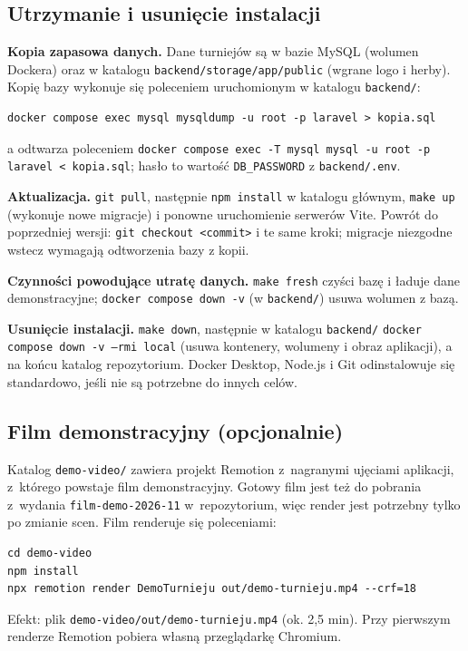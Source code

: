 \documentclass[11pt,a4paper,oneside]{article}
\newif\ifpodpowiedzi
\newcommand{\podpowiedz}[1]{\ifpodpowiedzi\par\begingroup\small\color{hintcolor}\textit{Wskazówka: #1}\par\endgroup\fi}
\begin{document}
\subsection{Utrzymanie i usunięcie instalacji}
\podpowiedz{Jeśli dotyczy: opisz kopie zapasowe i odtwarzanie danych, aktualizację projektu, powrót do poprzedniej wersji i usunięcie instalacji. Wskaż, które pliki lub dane należy zachować oraz które czynności mogą spowodować ich utratę. Dostosuj zakres do projektu; nie twórz procedur dla funkcji, których rozwiązanie nie ma.}
\textbf{Kopia zapasowa danych.} Dane turniejów są w bazie MySQL (wolumen Dockera) oraz w katalogu \texttt{backend/storage/app/public} (wgrane logo i herby). Kopię bazy wykonuje się poleceniem uruchomionym w katalogu \texttt{backend/}:
\begin{verbatim}
docker compose exec mysql mysqldump -u root -p laravel > kopia.sql
\end{verbatim}
a odtwarza poleceniem \texttt{docker compose exec -T mysql mysql -u root -p laravel < kopia.sql}; hasło to wartość \texttt{DB\_PASSWORD} z \texttt{backend/.env}.

\textbf{Aktualizacja.} \texttt{git pull}, następnie \texttt{npm install} w katalogu głównym, \texttt{make up} (wykonuje nowe migracje) i ponowne uruchomienie serwerów Vite. Powrót do poprzedniej wersji: \texttt{git checkout <commit>} i te same kroki; migracje niezgodne wstecz wymagają odtworzenia bazy z kopii.

\textbf{Czynności powodujące utratę danych.} \texttt{make fresh} czyści bazę i ładuje dane demonstracyjne; \texttt{docker compose down -v} (w \texttt{backend/}) usuwa wolumen z bazą.

\textbf{Usunięcie instalacji.} \texttt{make down}, następnie w katalogu \texttt{backend/} \texttt{docker compose down -v --rmi local} (usuwa kontenery, wolumeny i obraz aplikacji), a na końcu katalog repozytorium. Docker Desktop, Node.js i Git odinstalowuje się standardowo, jeśli nie są potrzebne do innych celów.

\subsection{Film demonstracyjny (opcjonalnie)}
Katalog \texttt{demo-video/} zawiera projekt Remotion z~nagranymi ujęciami aplikacji, z~którego powstaje film demonstracyjny. Gotowy film jest też do pobrania z~wydania \texttt{film-demo-2026-11} w~repozytorium, więc render jest potrzebny tylko po zmianie scen. Film renderuje się poleceniami:
\begin{verbatim}
cd demo-video
npm install
npx remotion render DemoTurnieju out/demo-turnieju.mp4 --crf=18
\end{verbatim}
Efekt: plik \texttt{demo-video/out/demo-turnieju.mp4} (ok. 2,5 min). Przy pierwszym renderze Remotion pobiera własną przeglądarkę Chromium.
\end{document}
